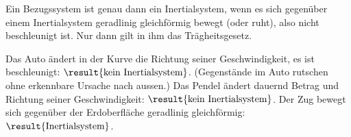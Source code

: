 Ein Bezugssystem ist genau dann ein Inertialsystem, wenn es sich gegenüber einem Inertialsystem geradlinig gleichförmig bewegt (oder ruht), also nicht beschleunigt ist. Nur dann gilt in ihm das Trägheitsgesetz.
\begin{abcliste}
\abc Das Auto ändert in der Kurve die Richtung seiner Geschwindigkeit, es ist beschleunigt: $\result{\text{kein Inertialsystem}}$. (Gegenstände im Auto rutschen ohne erkennbare Ursache nach aussen.)
\abc Das Pendel ändert dauernd Betrag und Richtung seiner Geschwindigkeit: $\result{\text{kein Inertialsystem}}$.
\abc Der Zug bewegt sich gegenüber der Erdoberfläche geradlinig gleichförmig: $\result{\text{Inertialsystem}}$.
\end{abcliste}
